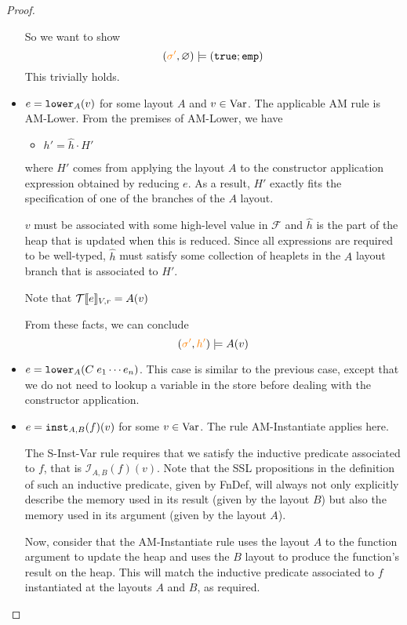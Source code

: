\begin{proof}
\begin{itemize}
      So we want to show
      \[
        (\EndSigma, \emptyheap) \models (\verb|true| ; \emp)
      \]
      This trivially holds.

    \item $e = \texttt{lower}_{A}(v)$ for some layout $A$ and $v \in \textnormal{Var}$.
      The applicable {\sc AM} rule is {\sc AM-Lower}.
      From the premises of {\sc AM-Lower}, we have
      \begin{itemize}
        \item $h' = \hat{h} \cdot H'$
      \end{itemize}
      where $H'$ comes from applying the layout $A$ to the constructor application expression
      obtained by reducing $e$. As a result, $H'$ exactly fits the specification of
      one of the branches of the $A$ layout.

      $v$ must be associated with some high-level value in $\mathcal{F}$ and $\hat{h}$
      is the part of the heap that is updated when this is reduced. Since all expressions
      are required to be well-typed, $\hat{h}$ must satisfy some collection of heaplets
      in the $A$ layout branch that is associated to $H'$.

      Note that $\mathcal{T}\llbracket e\rrbracket_{V,r} = A(v)$

      From these facts, we can conclude
      \[
        ({\color{orange} \sigma'}, {\color{orange} h'}) \models A(v)
      \]

    \item $e = \texttt{lower}_{A}(C\; e_1 \cdots e_n)$. This case is similar to the previous case,
      except that we do not need to lookup a variable in the store before dealing with the constructor
      application.

    \item $e = \texttt{inst}_{A,B}(f)(v)$ for some $v \in \textnormal{Var}$.
        The rule {\sc AM-Instantiate} applies here.

        The {\sc S-Inst-Var} rule requires that we satisfy the inductive predicate
        associated to $f$, that is $\mathcal{I}_{A,B}(f)(v)$. Note that the SSL propositions in the definition of
        such an inductive predicate, given by {\sc FnDef}, will always not only explicitly
        describe the memory used in its result (given by the layout $B$) but also the memory used
        in its argument (given by the layout $A$).

        Now, consider that the {\sc AM-Instantiate} rule uses the layout $A$ to the function argument to
        update the heap and uses the $B$ layout to produce the function's result on the heap. This will match the
        inductive predicate associated to $f$ instantiated at the layouts $A$ and $B$, as required.


\end{itemize}
\end{proof}
